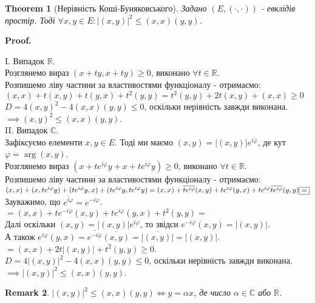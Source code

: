 \documentclass[a4paper, 10pt]{article}
\makeatletter
\def\qed{$\blacksquare$}
\theoremstyle{theoremdd}
\newtheorem{theorem}{Theorem}[subsection]
\theoremstyle{theoremdd}
\theoremstyle{theoremdd}
\theoremstyle{theoremdd}
\theoremstyle{theoremdd}
\theoremstyle{theoremdd}
\newtheorem{remark}[theorem]{Remark}
\theoremstyle{theoremdd}
\theoremstyle{theoremdd}
\renewenvironment{proof}[1][Proof.\\]{\par
\pushQED{\hfill \qed}%
\normalfont \topsep6\p@\@plus6\p@\relax
\trivlist
\item\relax
{\bfseries
#1\@addpunct{.}}\hspace\labelsep\ignorespaces
}{%
\popQED\endtrivlist\@endpefalse
}
\makeatother
\begin{document}
\begin{theorem}[Нерівність Коші-Буняковського]
Задано $(E, (\cdot , \cdot))$ - евклідів простір. Тоді $\forall x,y \in E: |(x,y)|^2 \leq (x,x)(y,y)$.
\end{theorem}

\begin{proof}
I. Випадок $\mathbb{R}$.\\
Розглянемо вираз $(x+ty, x+ty) \geq 0$, виконано $\forall t \in \mathbb{R}$.\\
Розпишемо ліву частини за властивостями функціоналу - отримаємо:\\
$(x,x) + t(x,y) + t(y,x) + t^2(y,y) = t^2(y,y) + 2t(x,y) + (x,x) \geq 0$\\
$D = 4(x,y)^2 - 4(x,x)(y,y) \leq 0$, оскільки нерівність завжди виконана.\\
$\implies (x,y)^2 \leq (x,x)(y,y)$.
\bigskip \\
II. Випадок $\mathbb{C}$.\\
Зафіксуємо елементи $x,y \in E$. Тоді ми маємо $(x,y) = |(x,y)|e^{i \varphi}$, де кут $\varphi = \arg (x,y)$.\\
Розглянемо вираз $(x+te^{i\varphi}y + x + t e^{i\varphi}y) \geq 0$, виконано $\forall t \in \mathbb{R}$.\\
Розпишемо ліву частини за властивостями функціоналу - отримаємо:\\
$(x,x)+(x,te^{i\varphi}y) + (te^{i\varphi}y,x)+(te^{i\varphi}y, te^{i\varphi}y)
= (x,x) + \overline{t e^{i\varphi}}(x,y) + te^{i \varphi} (y,x) + te^{i \varphi} \overline{t e^{i\varphi}} (y,y) \boxed{=} \\ $
Зауважимо, що $\overline{e^{i\varphi}} = e^{-i\varphi}$.\\
$\boxed{=} (x,x) + te^{-i\varphi}(x,y) + te^{i\varphi}(y,x) + t^2(y,y) \boxed{=}$\\
Далі оскільки $(x,y) = |(x,y)|e^{i \varphi}$, то звідси $e^{-i \varphi}(x,y) = |(x,y)|$.\\
А також $e^{i\varphi}(y,x) = \overline{e^{-i\varphi}} \overline{(x,y)} = \overline{|(x,y)|} = |(x,y)|$.\\
$\boxed{=} (x,x) + 2t|(x,y)| + t^2(y,y) \geq 0$.\\
$D = 4|(x,y)|^2 - 4(x,x)(y,y) \leq 0$, оскільки нерівність завжди виконана.\\
$\implies |(x,y)|^2 \leq (x,x)(y,y)$.
\end{proof}

\begin{remark}
$|(x,y)|^2 \leq (x,x)(y,y) \iff y = \alpha x$, де число $\alpha \in \mathbb{C}$ або $\mathbb{R}$.
\end{remark}
\end{document}
